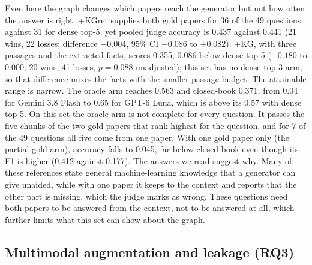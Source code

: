 \documentclass[preprint,12pt]{elsarticle}
\begin{document}
Even here the graph changes which papers reach the generator but not how
often the answer is right. +KGret supplies both gold papers for 36 of the 49
questions against 31 for dense top-5, yet pooled judge accuracy is 0.437
against 0.441 (21 wins, 22 losses; difference $-0.004$, 95\% CI $-0.086$ to
$+0.082$). +KG, with three passages and the extracted facts, scores 0.355,
0.086 below dense top-5 ($-0.180$ to 0.000; 20 wins, 41 losses, $p=0.088$
unadjusted); this set has no dense top-3 arm, so that difference mixes the
facts with the smaller passage budget. The attainable range is narrow. The
oracle arm reaches 0.563 and closed-book 0.371, from 0.04 for Gemini 3.8
Flash to 0.65 for GPT-6 Luna, which is above its 0.57 with dense top-5. On this
set the oracle arm is not
complete for every question. It passes the five chunks of the two gold papers
that rank highest for the question, and for 7 of the 49 questions all five
come from one paper. With one gold paper only (the partial-gold arm), accuracy
falls to 0.045, far below closed-book even though its F1 is higher (0.412
against 0.177). The answers we read suggest why. Many of these references state
general machine-learning knowledge that a generator can give unaided, while
with one paper it keeps to the context and reports that the other part is
missing, which the judge marks as wrong. These questions need both papers to
be answered from the context, not to be answered at all, which further limits
what this set can show about the graph.

\subsection{Multimodal augmentation and leakage (RQ3)}
\label{sec:res-mm}
\end{document}

